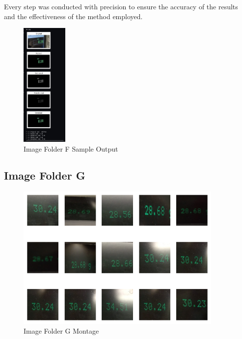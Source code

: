 Every step was conducted with precision to ensure the accuracy of the results and the effectiveness of the method employed.

\begin{figure}[ht]
    \centering
    \includegraphics[width=0.2\textwidth]{Figures/Methodology/sipa_07/sample_output.jpg}
    \caption[Image Folder F Sample Output]{Image Folder F Sample Output}
    \label{fig:Image Folder F Sample Output}
\end{figure}


\newpage

\subsection{Image Folder G}

\begin{figure}[ht]
    \centering
    \includegraphics[width=0.9\textwidth]{Figures/EDA_Charts/8/montage.png}
    \caption[Image Folder G Montage]{Image Folder G Montage}
    \label{fig:Image Folder G Montage}
\end{figure}

